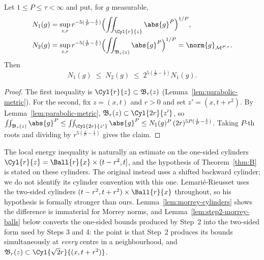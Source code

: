 \documentclass[11pt,reqno]{amsart}
\begin{document}
\begin{lemma}
\label{lem:morrey-cylinders}
Let $1\le P\le\tau<\infty$ and put, for $g$ measurable,
\[
\begin{aligned}
&N_{1}(g)=\sup_{z,r}r^{-5(\frac1P-\frac1\tau)}
    \Bigl(\iint_{\Cyl{r}{z}}\abs{g}^{P}\Bigr)^{1/P},
  \\
 &  N_{2}(g)=\sup_{z,r}r^{-5(\frac1P-\frac1\tau)}
    \Bigl(\iint_{\mathfrak{B}_{r}(z)}\abs{g}^{P}\Bigr)^{1/P}
   =\norm{g}_{\mathcal{M}^{P,\tau}} .
\end{aligned}
\]
Then
\begin{equation}\label{eq:morrey-cyl}
  N_{1}(g)\;\le\;N_{2}(g)\;\le\;2^{5(\frac1P-\frac1\tau)}N_{1}(g).
\end{equation}
\end{lemma}

\begin{proof}
The first inequality is $\Cyl{r}{z}\subset\mathfrak{B}_{r}(z)$
(Lemma~\ref{lem:parabolic-metric}). For the second, fix $z=(x,t)$ and $r>0$
and set $z'=(x,t+r^{2})$. By Lemma~\ref{lem:parabolic-metric},
$\mathfrak{B}_{r}(z)\subset\Cyl{2r}{z'}$, so
$\iint_{\mathfrak{B}_{r}(z)}\abs{g}^{P}\le\iint_{\Cyl{2r}{z'}}\abs{g}^{P}
 \le N_{1}(g)^{P}\,(2r)^{5P(\frac1P-\frac1\tau)}$. Taking $P$-th roots and
dividing by $r^{5(\frac1P-\frac1\tau)}$ gives the claim.
\end{proof}

\begin{remark}
\label{rem:one-sided}
The local energy inequality is naturally an estimate on the one-sided cylinders
$\Cyl{r}{z}=\Ball{r}{x}\times(t-r^{2},t]$, and the hypothesis of
Theorem~\ref{thm:B} is stated on these cylinders. The original
\cite[Proposition 2]{CKN1982} instead uses a shifted backward cylinder;
we do not identify its cylinder convention with this one.
Lemarié-Rieusset \cite[\S13.8]{LemarieRieusset2016} uses the two-sided
cylinders $(t-r^{2},t+r^{2})\times\Ball{r}{x}$ throughout, so his hypothesis is
formally stronger than ours. Lemma~\ref{lem:morrey-cylinders} shows the
difference is immaterial for Morrey norms, and
Lemma~\ref{lem:step2-morrey-balls} below converts the one-sided bounds produced
by Step~2 into the two-sided form used by Steps 3 and 4: the point is that
Step~2 produces its bounds simultaneously at \emph{every} centre in a
neighbourhood, and $\mathfrak{B}_{r}(z)\subset\Cyl{\sqrt2 r}{(x,t+r^{2})}$.
\end{remark}
\end{document}

